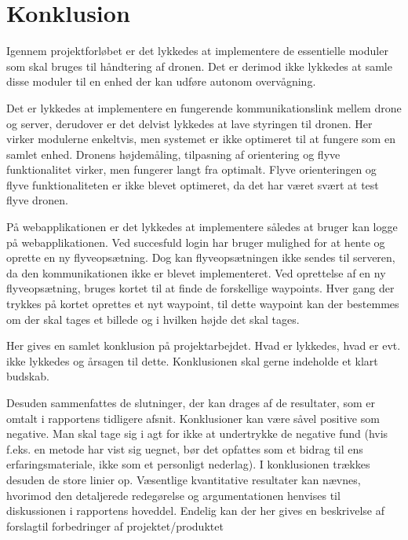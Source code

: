 \section{Konklusion}



Igennem projektforløbet er det lykkedes at implementere de essentielle moduler som skal bruges til håndtering af dronen. Det er derimod ikke lykkedes at samle disse moduler til en enhed der kan udføre autonom overvågning. 

Det er lykkedes at implementere en fungerende kommunikationslink mellem drone og server, derudover er det delvist lykkedes at lave styringen til dronen. Her virker modulerne enkeltvis, men systemet er ikke optimeret til at fungere som en samlet enhed. Dronens højdemåling, tilpasning af orientering og flyve funktionalitet virker, men fungerer langt fra optimalt.
Flyve orienteringen og flyve funktionaliteten er ikke blevet optimeret, da det har været svært at test flyve dronen. 


På webapplikationen er det lykkedes at implementere således at bruger kan logge på webapplikationen. Ved succesfuld login har bruger mulighed for at hente og oprette en ny flyveopsætning. Dog kan flyveopsætningen ikke sendes til serveren, da den kommunikationen ikke er blevet implementeret. Ved oprettelse af en ny flyveopsætning, bruges kortet til at finde de forskellige waypoints. Hver gang der trykkes på kortet oprettes et nyt waypoint, til dette waypoint kan der bestemmes om der skal tages et billede og i hvilken højde det skal tages.



Her gives en samlet konklusion på projektarbejdet. Hvad er lykkedes, hvad er evt. ikke 
lykkedes og årsagen til dette. Konklusionen skal gerne indeholde et klart budskab. 

Desuden sammenfattes de slutninger, der kan drages af de resultater, som er omtalt i rapportens tidligere afsnit. Konklusioner kan være såvel positive som negative. Man skal 
tage sig i agt for ikke at undertrykke de negative fund (hvis f.eks. en metode har vist sig 
uegnet, bør det opfattes som et bidrag til ens erfaringsmateriale, ikke som et personligt 
nederlag). 
I konklusionen trækkes desuden de store linier op. Væsentlige kvantitative resultater kan 
nævnes, hvorimod den detaljerede redegørelse og argumentationen henvises til diskussionen i rapportens hoveddel. 
Endelig kan der her gives en beskrivelse af forslagtil forbedringer af projektet/produktet